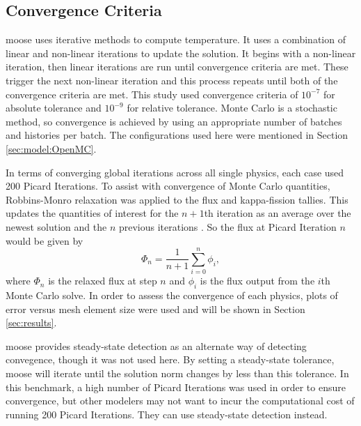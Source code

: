 \documentclass[letterpaper]{mc2023}
\begin{document}
\subsection{Convergence Criteria}
\gls{moose} uses iterative methods to compute temperature. It uses a combination of linear and non-linear iterations to update the
solution. It begins with a non-linear iteration, then linear iterations are run until convergence criteria are met. These trigger the
next non-linear iteration and this process repeats until both of the convergence criteria are met. This study used convergence criteria
of $10^{-7}$ for absolute tolerance and $10^{-9}$ for relative tolerance. Monte Carlo is a stochastic method, so convergence is achieved
by using an appropriate number of batches and histories per batch. The configurations used here were mentioned in Section
\ref{sec:model:OpenMC}.

In terms of converging global iterations across all single physics, each case used 200 Picard Iterations. To assist with
convergence of Monte Carlo quantities, Robbins-Monro relaxation was applied to the flux and kappa-fission tallies. This updates the
quantities of interest for the $n+1$th iteration as an average over the newest solution and the $n$ previous iterations \cite{dufek}.
So the flux at Picard Iteration $n$ would be given by
\begin{equation}\label{eq:Robbins-Monro}
    \Phi_{n} = \frac{1}{n+1} \sum_{i=0}^{n} \phi_{i},
\end{equation}
where $\Phi_{n}$ is the relaxed flux at step $n$ and $\phi_{i}$ is the flux output from the $i$th Monte Carlo solve. In order to
assess the convergence of each physics, plots of error versus mesh element size were used and will be shown in Section \ref{sec:results}.

\gls{moose} provides steady-state detection as an alternate way of detecting convegence, though it was not used here. By setting a
steady-state tolerance, \gls{moose} will iterate until the solution norm changes by less than this tolerance. In this benchmark, a
high number of Picard Iterations was used in order to ensure convergence, but other modelers may not want to incur the computational
cost of running 200 Picard Iterations. They can use steady-state detection instead.
\end{document}
